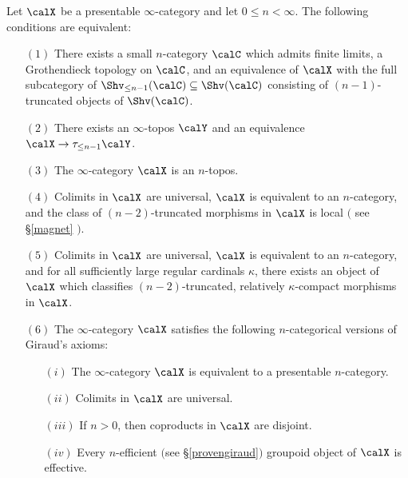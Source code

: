 \begin{theorem}\label{nchar}
Let $\calX$ be a presentable $\infty$-category and let $0 \leq n < \infty$. The following conditions are equivalent:
\begin{itemize}
\item[$(1)$] There exists a small $n$-category $\calC$ which admits finite limits, a Grothendieck topology on $\calC$, and an equivalence of $\calX$ with the full subcategory of $\Shv_{\leq n-1}(\calC) \subseteq \Shv(\calC)$ consisting of $(n-1)$-truncated objects of $\Shv(\calC)$.

\item[$(2)$] There exists an $\infty$-topos $\calY$ and an equivalence
$\calX \rightarrow \tau_{\leq n-1} \calY$.

\item[$(3)$] The $\infty$-category $\calX$ is an $n$-topos.

\item[$(4)$] Colimits in $\calX$ are universal, $\calX$ is equivalent to an $n$-category, and the class of $(n-2)$-truncated morphisms
in $\calX$ is local $($ see \S \ref{magnet} $)$.

\item[$(5)$] Colimits in $\calX$ are universal, $\calX$ is equivalent to an $n$-category, and for all sufficiently large regular cardinals $\kappa$, there exists an object of $\calX$ which classifies
$(n-2)$-truncated, relatively $\kappa$-compact morphisms in $\calX$.

\item[$(6)$] The $\infty$-category $\calX$ satisfies the following $n$-categorical versions
of Giraud's axioms:

\begin{itemize}
\item[$(i)$] The $\infty$-category $\calX$ is equivalent to a presentable $n$-category.
\item[$(ii)$] Colimits in $\calX$ are universal.
\item[$(iii)$] If $n > 0$, then coproducts in $\calX$ are disjoint.
\item[$(iv)$] Every $n$-efficient $($see \S \ref{provengiraud}$)$ groupoid object of $\calX$ is effective.
\end{itemize}
\end{itemize}
\end{theorem}

